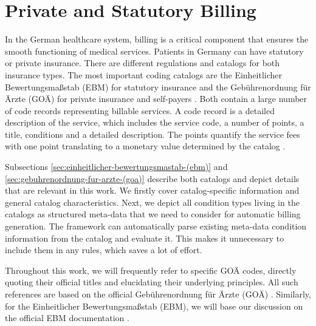 \chapter{Private and Statutory Billing}\label{ch:billing-in-the-german-healthcare-system}

In the German healthcare system, billing is a critical component that ensures the smooth functioning of medical services.
Patients in Germany can have statutory or private insurance.
There are different regulations and catalogs for both insurance types.
The most important coding catalogs are the Einheitlicher Bewertungsmaßstab (EBM) for statutory insurance and the Gebührenordnung für Ärzte (GOÄ) for private insurance and self-payers \cite{Stausberg1998}.
Both contain a large number of code records representing billable services.
A code record is a detailed description of the service, which includes the service code, a number of points, a title, conditions and a detailed description.
The points quantify the service fees with one point translating to a monetary value determined by the catalog \cite{Stausberg1998}.

Subsections \ref{sec:einheitlicher-bewertungsmastab-(ebm)} and \ref{sec:gebuhrenordnung-fur-arzte-(goa)} describe both catalogs and depict details that are relevant in this work.
We firstly cover catalog-specific information and general catalog characteristics.
Next, we depict all condition types living in the catalogs as structured meta-data that we need to consider for automatic billing generation.
The framework can automatically parse existing meta-data condition information from the catalog and evaluate it.
This makes it unnecessary to include them in any rules, which saves a lot of effort.

Throughout this work, we will frequently refer to specific GOÄ codes, directly quoting their official titles and elucidating their underlying principles.
All such references are based on the official Gebührenordnung für Ärzte (GOÄ) \cite{bruck1998kommentar}.
Similarly, for the Einheitlicher Bewertungsmaßstab (EBM), we will base our discussion on the official EBM documentation \cite{hermanns2015ebm}.



